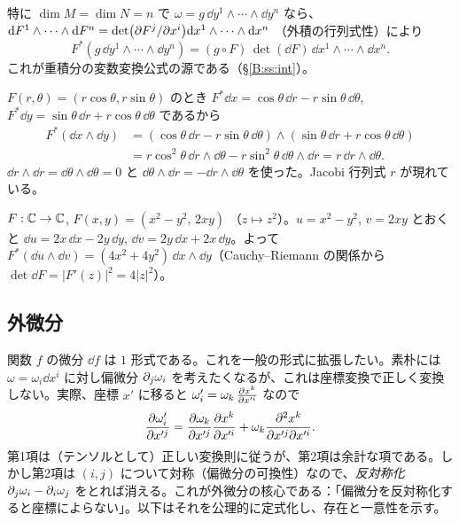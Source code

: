 特に $\dim M=\dim N=n$ で $\omega=g\,\dd y^1\wedge\cdots\wedge\dd y^n$ なら、$\mathrm{d} F^{1}\wedge\cdots\wedge\mathrm{d} F^{n}=\det\bigl(\partial F^j/\partial x^i\bigr)\mathrm{d} x^1\wedge\cdots\wedge\mathrm{d} x^n$ （外積の行列式性）により
\begin{equation}\label{B:eq:jacobian}
F^*(g\,\dd y^1\wedge\cdots\wedge\dd y^n)=(g\circ F)\,\det(\dd F)\,\dd x^1\wedge\cdots\wedge\dd x^n .
\end{equation}
これが重積分の変数変換公式の源である（\S\ref{B:ss:int}）。

\begin{ex}[極座標]\label{B:ex:polar}
$F(r,\theta)=(r\cos\theta,r\sin\theta)$ のとき $F^*\dd x=\cos\theta\,\dd r-r\sin\theta\,\dd\theta$, $F^*\dd y=\sin\theta\,\dd r+r\cos\theta\,\dd\theta$ であるから
\begin{align*}
F^*(\dd x\wedge\dd y)&=(\cos\theta\,\dd r-r\sin\theta\,\dd\theta)\wedge(\sin\theta\,\dd r+r\cos\theta\,\dd\theta)\\
&=r\cos^2\theta\,\dd r\wedge\dd\theta-r\sin^2\theta\,\dd\theta\wedge\dd r=r\,\dd r\wedge\dd\theta .
\end{align*}
$\dd r\wedge\dd r=\dd\theta\wedge\dd\theta=0$ と $\dd\theta\wedge\dd r=-\dd r\wedge\dd\theta$ を使った。Jacobi 行列式 $r$ が現れている。
\end{ex}

\begin{ex}[$z\mapsto z^2$]\label{B:ex:square}
$F:\mathbb C\to\mathbb C$, $F(x,y)=(x^2-y^2,\,2xy)$ （$z\mapsto z^2$）。$u=x^2-y^2$, $v=2xy$ とおくと $\dd u=2x\,\dd x-2y\,\dd y$, $\dd v=2y\,\dd x+2x\,\dd y$。よって $F^*(\dd u\wedge\dd v)=(4x^2+4y^2)\,\dd x\wedge\dd y$（Cauchy--Riemann の関係から $\det\dd F=|F'(z)|^2=4|z|^2$）。
\end{ex}

\subsection{外微分}\label{B:ss:d}

関数 $f$ の微分 $\dd f$ は $1$ 形式である。これを一般の形式に拡張したい。素朴には $\omega=\omega_i\dd x^i$ に対し偏微分 $\partial_j\omega_i$ を考えたくなるが、これは座標変換で正しく変換しない。実際、座標 $x'$ に移ると $\omega'_i=\omega_k\,\frac{\partial x^k}{\partial x'^i}$ なので
\[
\frac{\partial\omega'_i}{\partial x'^j}=\frac{\partial\omega_k}{\partial x'^j}\frac{\partial x^k}{\partial x'^i}+\omega_k\frac{\partial^2x^k}{\partial x'^j\partial x'^i}.
\]
第1項は（テンソルとして）正しい変換則に従うが、第2項は余計な項である。しかし第2項は $(i,j)$ について対称（偏微分の可換性）なので、\emph{反対称化} $\partial_j\omega_i-\partial_i\omega_j$ をとれば消える。これが外微分の核心である：「偏微分を反対称化すると座標によらない」。以下はそれを公理的に定式化し、存在と一意性を示す。

